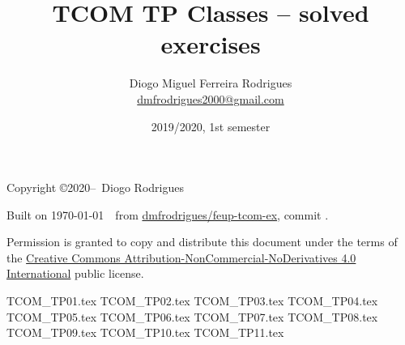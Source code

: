 \documentclass{tcom}
\title{TCOM TP Classes -- solved exercises}
\author{Diogo Miguel Ferreira Rodrigues \\ \href{mailto:dmfrodrigues2000@gmail.com}{dmfrodrigues2000@gmail.com}}
\date{2019/2020, 1st semester}
\begin{document}
\maketitle
\begin{secondpage}
    Copyright \copyright 2020--\the\year\ Diogo Rodrigues\par
    \par
    \immediate{}
    Built on \today~\currenttime~from \href{https://github.com/dmfrodrigues/feup-tcom-ex}{dmfrodrigues/feup-tcom-ex}, commit \unskip.\par
    Permission is granted to copy and distribute this document under the terms of the
    \href{https://creativecommons.org/licenses/by-nc-nd/4.0/}{Creative Commons Attribution-NonCommercial-NoDerivatives 4.0 International}
    public license.
\end{secondpage}
\frontmatter
\tableofcontents
\mainmatter
{TCOM_TP01.tex}
{TCOM_TP02.tex}
{TCOM_TP03.tex}
{TCOM_TP04.tex}
{TCOM_TP05.tex}
{TCOM_TP06.tex}
{TCOM_TP07.tex}
{TCOM_TP08.tex}
{TCOM_TP09.tex}
{TCOM_TP10.tex}
{TCOM_TP11.tex}
\end{document}
